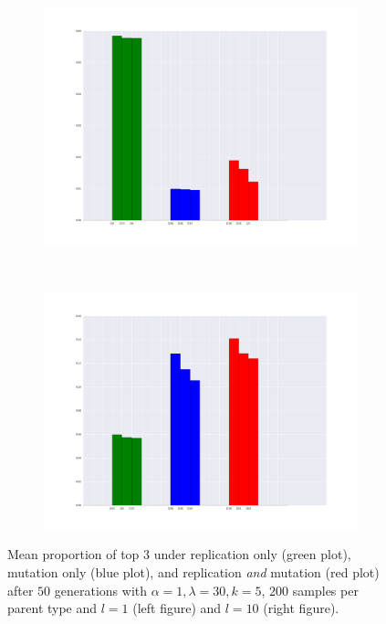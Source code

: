 \documentclass[a4paper]{article}
\begin{document}
%
\begin{figure}[h!]
  \centering
  \begin{subfigure}[b]{0.45\textwidth}
    \includegraphics[scale=0.25]{../code-LOT-extension/plots/rmd-l30-a1-k5-l1-meFalse432.png}
  \end{subfigure}
  ~
   \begin{subfigure}[b]{0.45\textwidth}
    \includegraphics[scale=0.25]{../code-LOT-extension/plots/rmd-l30-a1-k5-l10-meFalse432.png}
  \end{subfigure}
  \caption{Mean proportion of top $3$ under replication only (green plot), mutation only (blue plot), and replication {\em and} mutation (red plot) after $50$ generations with $\alpha = 1, \lambda = 30, k = 5$, $200$ samples per parent type and $l = 1$ (left figure) and $l = 10$ (right figure).}
  \label{fig:outcomes}
\end{figure}
%
\end{document}
